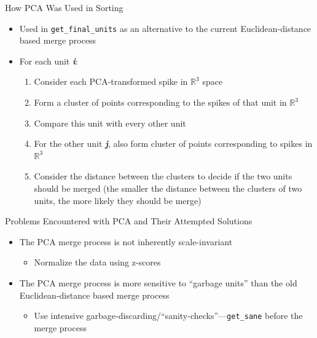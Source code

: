 \documentclass{beamer}
\begin{document}
    \begin{frame}{How PCA Was Used in Sorting}
        \begin{itemize}
            \pause
            \item Used in \texttt{get\_final\_units} as an alternative to the
current Euclidean-distance based merge process
            \pause
            \item For each unit \textbf{\emph{i}}:
            \begin{enumerate}
                \pause
                \item Consider each PCA-transformed spike in
\ensuremath{\mathbb{R}^3} space
                \pause
                \item Form a cluster of points corresponding to the spikes of that unit in
\ensuremath{\mathbb{R}^3}
                \pause
                \item Compare this unit with every other unit
                \pause
                \item For the other unit \textbf{\emph{j}}, also form 
cluster of points corresponding to spikes in \ensuremath{\mathbb{R}^3}
                \pause
                \item Consider the distance between the clusters to decide if
the two units should be merged (the smaller the distance between the clusters of
two units, the more likely they should be merge)
            \end{enumerate}
         \end{itemize}
    \end{frame}

    \begin{frame}{Problems Encountered with PCA and Their Attempted Solutions}
        \begin{itemize}
            \pause
            \item The PCA merge process is not inherently scale-invariant
            \begin{itemize}
                \pause
                \item Normalize the data using z-scores
            \end{itemize}
                \pause
            \item The PCA merge process is more sensitive to ``garbage units''
than the old Euclidean-distance based merge process
            \begin{itemize}
                \pause
                \item Use intensive
garbage-discarding/``sanity-checks''---\texttt{get\_sane} before the merge
process
            \end{itemize}
        \end{itemize}
    \end{frame}
    
\end{document}
